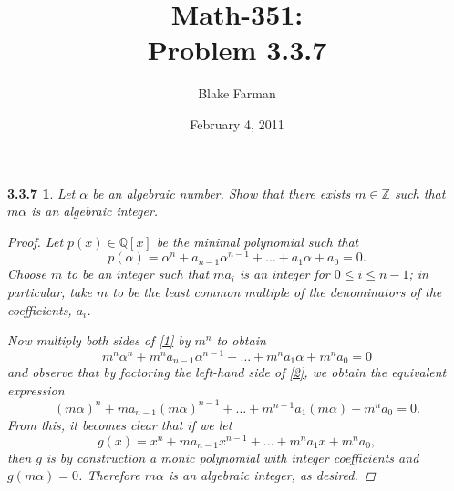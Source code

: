 \documentclass[10pt]{amsart}
\author{Blake Farman}
\title{Math-351:\\Problem 3.3.7}
\date{February 4, 2011}\pdfpagewidth 8.5in
\begin{document}
\maketitle

\renewcommand{\qedsymbol}{\(\blacksquare\)}
\newcommand{\znz}[1]{\mathbb{Z} / #1\mathbb{Z}}
\newcommand{\mznz}[1]{(\mathbb{Z} / #1\mathbb{Z})^*}
\newcommand{\Z}{\mathbb{Z}}
\newcommand{\Q}{\mathbb{Q}}
\newtheorem*{1}{3.3.7}
\begin{1}
  Let $\alpha$ be an algebraic number.  Show that there exists $m\in\Z$ such that $m\alpha$ is an algebraic integer.
  \begin{proof}
    Let $p(x) \in \Q[x]$ be the minimal polynomial such that 
    \begin{equation}
      \label{1}
      p(\alpha) = \alpha^n + a_{n-1}\alpha^{n-1} + \ldots + a_1\alpha + a_0 = 0.
    \end{equation}
    Choose $m$ to be an integer such that $ma_i$ is an integer for $0 \leq i \leq n-1$; 
    in particular, take $m$ to be the least common multiple of the denominators of the coefficients, $a_i$.
    
    Now multiply both sides of \eqref{1} by $m^n$ to obtain
    \begin{equation}
      \label{2}
      m^n\alpha^n + m^na_{n-1}\alpha^{n-1} + \ldots + m^na_1\alpha + m^na_0 = 0
    \end{equation}
    and observe that by factoring the left-hand side of \eqref{2}, we obtain the equivalent expression $$(m\alpha)^n + ma_{n-1}(m\alpha)^{n-1} + \ldots + m^{n-1}a_1(m\alpha) + m^na_0 = 0.$$
    From this, it becomes clear that if we let $$g(x) = x^n + ma_{n-1}x^{n-1} + \ldots + m^{n}a_1x + m^na_0,$$ then $g$ is by construction a monic polynomial with integer coefficients and \newline $g(m\alpha) = 0$.  Therefore $m\alpha$ is an algebraic integer, as desired.
  \end{proof}
\end{1}
\end{document}
